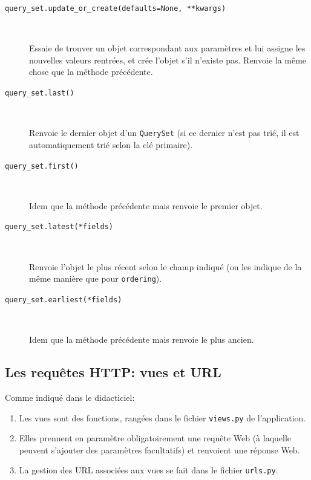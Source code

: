 \documentclass[a4paper, 10pt]{article}
\begin{document}
\begin{itemize}
\begin{description}
              \item[\texttt{query_set.update_or_create(defaults=None, **kwargs)}]~

                    Essaie de trouver un objet correspondant aux paramètres et lui assigne les nouvelles valeurs rentrées, et crée l'objet s'il n'existe pas. Renvoie la même chose que la méthode précédente.

              \item[\texttt{query_set.last()}]~

                    Renvoie le dernier objet d'un \texttt{QuerySet} (si ce dernier n'est pas trié, il est automatiquement trié selon la clé primaire).

              \item[\texttt{query_set.first()}]~

                    Idem que la méthode précédente mais renvoie le premier objet.

              \item[\texttt{query_set.latest(*fields)}]~

                    Renvoie l'objet le plus récent selon le champ indiqué (on les indique de la même manière que pour \texttt{ordering}).

              \item[\texttt{query_set.earliest(*fields)}]~

                    Idem que la méthode précédente mais renvoie le plus ancien.

          \end{description}
\end{itemize}

\subsection{Les requêtes HTTP: vues et URL}
Comme indiqué dans le didacticiel:
\begin{enumerate}
    \item Les vues sont des fonctions, rangées dans le fichier \texttt{views.py} de l'application.
    \item Elles prennent en paramètre obligatoirement une requête Web (à laquelle peuvent s'ajouter des paramètres facultatifs) et renvoient une réponse Web.
    \item La gestion des URL associées aux vues se fait dans le fichier \texttt{urls.py}.
\end{enumerate}
\end{document}
